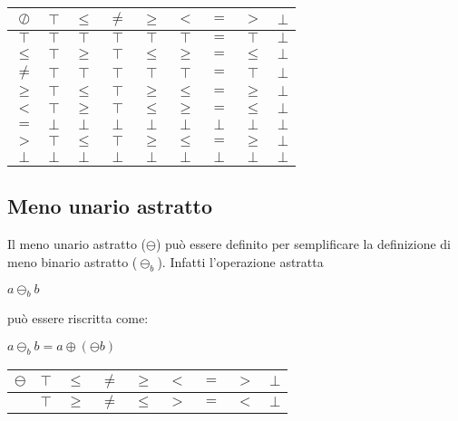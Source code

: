 \documentclass[a4paper, 12pt, oneside,fleqn]{book}
\begin{document}
\begin{center}
	\begin{tabular}{| c | c | c | c | c | c | c | c | c | }
		\hline
		$\oslash$ & $\top$ & $\leq$ & $\neq$ & $\geq$ & $<$ & $=$ & $>$ & $\bot$ \\
		\hline
		$\top$ & $\top$ & $\top$ & $\top$ & $\top$ & $\top$ & $=$ & $\top$ & $\bot$\\
		\hline
		$\leq$ & $\top$ & $\geq$ & $\top$ & $\leq$ & $\geq$ & $=$ & $\leq$ & $\bot$\\
		\hline
		$\neq$ & $\top$ & $\top$ & $\top$ & $\top$ & $\top$ & $=$ & $\top$ & $\bot$\\
		\hline
		$\geq$ & $\top$ & $\leq$ & $\top$ & $\geq$ & $\leq$ & $=$ & $\geq$ & $\bot$\\
		\hline
		$<$ & $\top$ & $\geq$ & $\top$ & $\leq$ & $\geq$ & $=$ & $\leq$ & $\bot$\\
		\hline
		$=$ & $\bot$ & $\bot$ & $\bot$ & $\bot$ & $\bot$ & $\bot$ & $\bot$ & $\bot$\\
		\hline
		$>$ & $\top$ & $\leq$ & $\top$ & $\geq$ & $\leq$ & $=$ & $\geq$ & $\bot$\\
		\hline
		$\bot$ & $\bot$ & $\bot$ & $\bot$ & $\bot$ & $\bot$ & $\bot$ & $\bot$ & $\bot$\\
		\hline
	\end{tabular}
\end{center}

\subsection{Meno unario astratto}

Il meno unario astratto ($\ominus$) può essere definito per semplificare la definizione di meno binario astratto ($\ominus_b$). Infatti l'operazione astratta
\begin{center}
	$ a \ominus_b b $
\end{center}
può essere riscritta come:

\begin{center}
	$ a  \ominus_b b = a \oplus (\ominus b) $
\end{center}

\begin{center}
	\begin{tabular}{| c | c | c | c | c | c | c | c | c | }
		\hline
		$\ominus$ & $\top$ & $\leq$ & $\neq$ & $\geq$ & $<$ & $=$ & $>$ & $\bot$ \\
		\hline
		  & $\top$ & $\geq$ & $\neq$ & $\leq$ & $>$ & $=$ & $<$ & $\bot$\\
		\hline
	\end{tabular}
\end{center}
\end{document}
